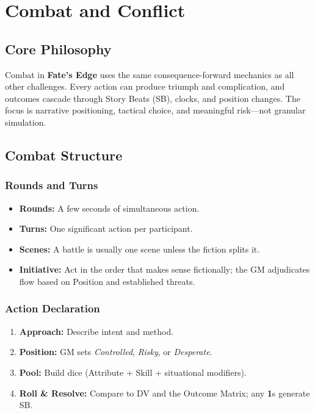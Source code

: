 \chapter{Combat and Conflict}
\label{chap:combat-conflict}

\section{Core Philosophy}
\label{sec:combat-philosophy}
Combat in \textbf{Fate's Edge} uses the same consequence-forward mechanics as all other challenges. Every action can produce triumph and complication, and outcomes cascade through Story Beats (SB), clocks, and position changes. The focus is narrative positioning, tactical choice, and meaningful risk—not granular simulation.

\section{Combat Structure}
\label{sec:combat-structure}

\subsection{Rounds and Turns}
\label{subsec:rounds-turns}
\begin{itemize}
  \item \textbf{Rounds:} A few seconds of simultaneous action.
  \item \textbf{Turns:} One significant action per participant.
  \item \textbf{Scenes:} A battle is usually one scene unless the fiction splits it.
  \item \textbf{Initiative:} Act in the order that makes sense fictionally; the GM adjudicates flow based on Position and established threats. 
\end{itemize}

\subsection{Action Declaration}
\label{subsec:action-declaration}
\begin{enumerate}
  \item \textbf{Approach:} Describe intent and method.
  \item \textbf{Position:} GM sets \textit{Controlled}, \textit{Risky}, or \textit{Desperate}. 
  \item \textbf{Pool:} Build dice (Attribute + Skill + situational modifiers).
  \item \textbf{Roll \& Resolve:} Compare to DV and the Outcome Matrix; any \textbf{1}s generate SB. 
\end{enumerate}

